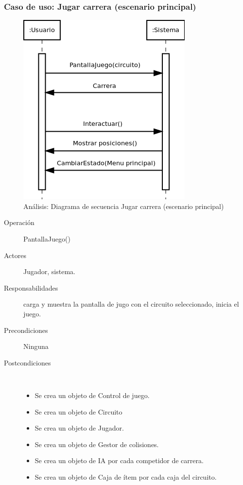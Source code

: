 \subsubsection{Caso de uso: Jugar carrera (escenario principal)}

\begin{figure}[H] 
  \label{secuencia_jugar}
  \begin{center}
    \includegraphics[scale=0.6]{imagenes/analisis/secuencia_jugar.png}
  \end{center}
  \caption{Análisis: Diagrama de secuencia Jugar carrera (escenario principal)}
\end{figure}

\begin{description} 
    \item [Operación] PantallaJuego()
    \item [Actores] Jugador, sistema.
    \item [Responsabilidades] carga y muestra la pantalla de jugo con el circuito seleccionado, inicia el juego.
    \item [Precondiciones] Ninguna
    \item [Postcondiciones] $\quad$
        \begin{itemize}
            \item Se crea un objeto de Control de juego.
            \item Se crea un objeto de Circuito
            \item Se crea un objeto de Jugador.
            \item Se crea un objeto de Gestor de colisiones.
            \item Se crea un objeto de IA por cada competidor de carrera.
            \item Se crea un objeto de Caja de ítem por cada caja del circuito.
        \end{itemize}
\end{description}

